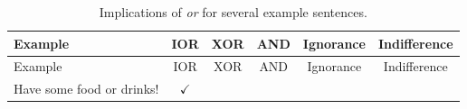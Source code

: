 \documentclass[oneside]{report}
\theoremstyle{definition}
\theoremstyle{definition}
\theoremstyle{definition}
\theoremstyle{remark}
\begin{document}
\begin{longtable}[]{@{}lccccc@{}}
\caption{\label{tab:implicationsall} Implications of \emph{or} for several
example sentences.}\tabularnewline
\toprule
\begin{minipage}[b]{0.47\columnwidth}\raggedright\strut
Example\strut
\end{minipage} & \begin{minipage}[b]{0.05\columnwidth}\centering\strut
IOR\strut
\end{minipage} & \begin{minipage}[b]{0.05\columnwidth}\centering\strut
XOR\strut
\end{minipage} & \begin{minipage}[b]{0.05\columnwidth}\centering\strut
AND\strut
\end{minipage} & \begin{minipage}[b]{0.09\columnwidth}\centering\strut
Ignorance\strut
\end{minipage} & \begin{minipage}[b]{0.12\columnwidth}\centering\strut
Indifference\strut
\end{minipage}\tabularnewline
\midrule
\endfirsthead
\toprule
\begin{minipage}[b]{0.47\columnwidth}\raggedright\strut
Example\strut
\end{minipage} & \begin{minipage}[b]{0.05\columnwidth}\centering\strut
IOR\strut
\end{minipage} & \begin{minipage}[b]{0.05\columnwidth}\centering\strut
XOR\strut
\end{minipage} & \begin{minipage}[b]{0.05\columnwidth}\centering\strut
AND\strut
\end{minipage} & \begin{minipage}[b]{0.09\columnwidth}\centering\strut
Ignorance\strut
\end{minipage} & \begin{minipage}[b]{0.12\columnwidth}\centering\strut
Indifference\strut
\end{minipage}\tabularnewline
\midrule
\endhead
\begin{minipage}[t]{0.47\columnwidth}\raggedright\strut
Have some food or drinks!\strut
\end{minipage} & \begin{minipage}[t]{0.05\columnwidth}\centering\strut
\(\checkmark\)\strut
\end{minipage} & \begin{minipage}[t]{0.05\columnwidth}\centering\strut

\end{minipage}
\end{longtable}
\end{document}
